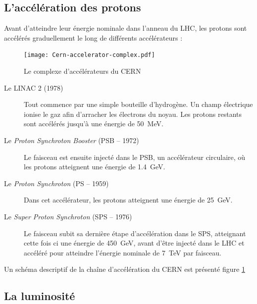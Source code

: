 \subsection{L'accélération des protons}
Avant d'atteindre leur énergie nominale dans l'anneau du LHC, les protons sont accélérés graduellement le long de différents accélérateurs :

\begin{figure} \centering
  \texttt{[image: Cern-accelerator-complex.pdf]}
  \caption{Le complexe d'accélérateurs du CERN}
  \label{fig:lhc_complex}
\end{figure}

\begin{description}
  \item[Le LINAC 2 (1978)] Tout commence par une simple bouteille d'hydrogène. Un champ électrique ionise le gaz afin d'arracher les électrons du noyau. Les protons restants sont accélérés jusqu'à une énergie de \SI{50}{\MeV}.
  \item[Le \emph{Proton Synchroton Booster} (PSB -- 1972)] Le faisceau est ensuite injecté dans le PSB, un accélérateur circulaire, où les protons atteignent une énergie de \SI{1.4}{\GeV}.
  \item[Le \emph{Proton Synchroton} (PS -- 1959)] Dans cet accélérateur, les protons atteignent une énergie de \SI{25}{GeV}.
  \item[Le \emph{Super Proton Synchroton} (SPS -- 1976)] Le faisceau subit sa dernière étape d'accélération dans le SPS, atteignant cette fois ci une énergie de \SI{450}{\GeV}, avant d'être injecté dans le LHC et accéléré pour atteindre l'énergie nominale de \SI{7}{\TeV} par faisceau.
\end{description}

Un schéma descriptif de la chaîne d'accélération du CERN est présenté figure \ref{fig:lhc_complex}

\subsection{La luminosité}

